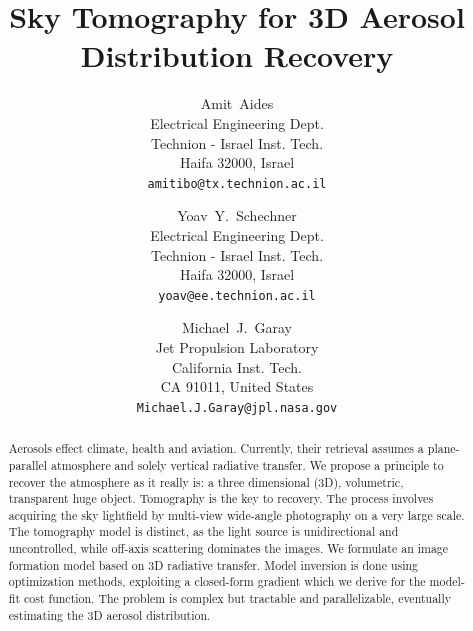 \documentclass[10pt,twocolumn,letterpaper]{article}
\begin{document}
\title{Sky Tomography for 3D Aerosol Distribution Recovery}

\author{Amit~Aides\\
  Electrical Engineering Dept.\\
  Technion - Israel Inst. Tech.\\
  Haifa 32000, Israel\\
  {\tt\small amitibo@tx.technion.ac.il} \and
  Yoav~Y.~Schechner\\
  Electrical Engineering Dept.\\
  Technion - Israel Inst. Tech.\\
  Haifa 32000, Israel\\
  {\tt\small yoav@ee.technion.ac.il} \and
  Michael~J.~Garay\\
  Jet Propulsion Laboratory\\
  California Inst. Tech.\\
  CA 91011, United States\\
  {\tt\small Michael.J.Garay@jpl.nasa.gov}
}

\maketitle
\thispagestyle{empty}

\begin{abstract}
  Aerosols effect climate, health and aviation.  Currently, their
  retrieval assumes a plane-parallel atmosphere and solely vertical
  radiative transfer. We propose a principle to recover the atmosphere
  as it really is: a three dimensional (3D), volumetric, transparent
  huge object. Tomography is the key to recovery. The process involves
  acquiring the sky lightfield by multi-view wide-angle photography on
  a very large scale. The tomography model is distinct, as the light
  source is unidirectional and uncontrolled, while off-axis scattering
  dominates the images.  We formulate an image formation model based
  on 3D radiative transfer. Model inversion is done using optimization
  methods, exploiting a closed-form gradient which we derive for the
  model-fit cost function. The problem is complex but tractable and
  parallelizable, eventually estimating the 3D aerosol distribution.
\end{abstract}
\end{document}
